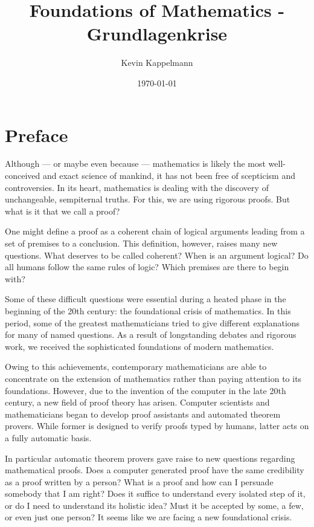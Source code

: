 \documentclass[hidelinks]{article}
\title{\textbf{Foundations of Mathematics - Grundlagenkrise}}
\author{Kevin Kappelmann}
\affil{Chair for Logic and Verification,\\ Technical University of Munich}
\date{\today}
\theoremstyle{plain}
\theoremstyle{definition}
\theoremstyle{rem}
\begin{document}

\maketitle
\newpage
\section*{Preface}
Although --- or maybe even because --- mathematics is likely the most well-conceived and exact science of mankind, it has not been free of scepticism and controversies. In its heart, mathematics is dealing with the discovery of unchangeable, sempiternal truths. For this, we are using rigorous proofs. But what is it that we call a proof? 

One might define a proof as a coherent chain of logical arguments leading from a set of premises to a conclusion. This definition, however, raises many new questions. What deserves to be called coherent? When is an argument logical? Do all humans follow the same rules of logic? Which premises are there to begin with?

Some of these difficult questions were essential during a heated phase in the beginning of the 20th century: the foundational crisis of mathematics. In this period, some of the greatest mathematicians tried to give different explanations for many of named questions. As a result of longstanding debates and rigorous work, we received the sophisticated foundations of modern mathematics.

Owing to this achievements, contemporary mathematicians are able to concentrate on the extension of mathematics rather than paying attention to its foundations. However, due to the invention of the computer in the late 20th century, a new field of proof theory has arisen. Computer scientists and mathematicians began to develop proof assistants and automated theorem provers. While former is designed to verify proofs typed by humans, latter acts on a fully automatic basis.

In particular automatic theorem provers gave raise to new questions regarding mathematical proofs. Does a computer generated proof have the same credibility as a proof written by a person? What is a proof and how can I persuade somebody that I am right? Does it suffice to understand every isolated step of it, or do I need to understand its holistic idea? Must it be accepted by some, a few, or even just one person? It seems like we are facing a new foundational crisis.
\end{document}
